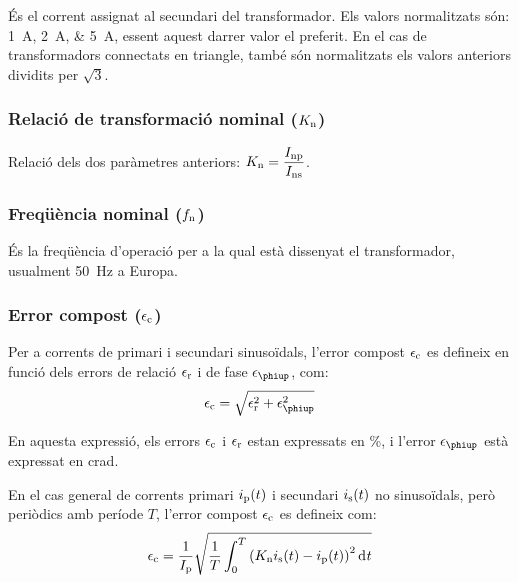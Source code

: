  És el corrent assignat al
secundari del transformador. Els valors normalitzats
són: \SIlist{1;2;5}{A}, essent aquest darrer valor el
preferit. En el cas de transformadors connectats en triangle, també són normalitzats els valors anteriors dividits per $ \sqrt{3}$.

\subsubsection{Relació de transformació nominal ($K_\mathrm{n}$)}

Relació dels dos  paràmetres anteriors: $K_\mathrm{n} = \dfrac{I_\mathrm{np}}{I_\mathrm{ns}}$.

\subsubsection{Freqüència nominal ($f_\mathrm{n}$)}

 És la freqüència d'operació per a la qual    està dissenyat el transformador, usualment \SI{50}{Hz} a Europa.

\subsubsection{Error compost ($\epsilon_\mathrm{c}$)}

Per a corrents de primari i secundari sinusoïdals, l'error compost $\epsilon_\mathrm{c}$ es defineix  en funció dels errors de relació $\epsilon_\mathrm{r}$ i de fase  $\epsilon\ped{\phiup}$, com:
\begin{equation}
    \epsilon\ped{c} = \sqrt{\epsilon\ped{r}^2 +  \epsilon\ped{\phiup}^2}
\end{equation}

En aquesta expressió, els errors $\epsilon_\mathrm{c}$ i $\epsilon_\mathrm{r}$  estan expressats en \si{\percent}, i l'error $\epsilon\ped{\phiup}$ està expressat en crad.

En el cas general de corrents primari $i_\mathrm{p}(t)$ i secundari $i_\mathrm{s}(t)$ no sinusoïdals, però periòdics amb període $T$, l'error compost $\epsilon_\mathrm{c}$ es defineix com:
\begin{equation}
    \epsilon\ped{c} = \frac{1}{I\ped{p}} \sqrt{\frac{1}{T} \int_0^T \left(K\ped{n} i\ped{s}(t) - i\ped{p}(t)\right)^2 \diff t}
\end{equation}

